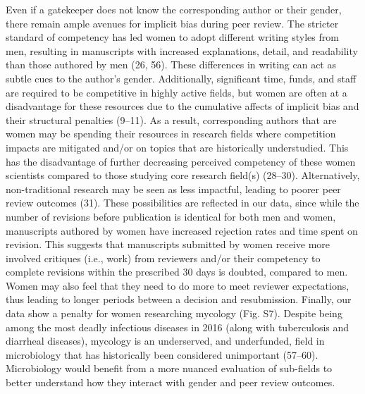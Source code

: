 \documentclass[11pt,]{article}
\begin{document}
Even if a gatekeeper does not know the corresponding author or their
gender, there remain ample avenues for implicit bias during peer review.
The stricter standard of competency has led women to adopt different
writing styles from men, resulting in manuscripts with increased
explanations, detail, and readability than those authored by men (26,
56). These differences in writing can act as subtle cues to the author's
gender. Additionally, significant time, funds, and staff are required to
be competitive in highly active fields, but women are often at a
disadvantage for these resources due to the cumulative affects of
implicit bias and their structural penalties (9--11). As a result,
corresponding authors that are women may be spending their resources in
research fields where competition impacts are mitigated and/or on topics
that are historically understudied. This has the disadvantage of further
decreasing perceived competency of these women scientists compared to
those studying core research field(s) (28--30). Alternatively,
non-traditional research may be seen as less impactful, leading to
poorer peer review outcomes (31). These possibilities are reflected in
our data, since while the number of revisions before publication is
identical for both men and women, manuscripts authored by women have
increased rejection rates and time spent on revision. This suggests that
manuscripts submitted by women receive more involved critiques (i.e.,
work) from reviewers and/or their competency to complete revisions
within the prescribed 30 days is doubted, compared to men. Women may
also feel that they need to do more to meet reviewer expectations, thus
leading to longer periods between a decision and resubmission. Finally,
our data show a penalty for women researching mycology (Fig. S7).
Despite being among the most deadly infectious diseases in 2016 (along
with tuberculosis and diarrheal diseases), mycology is an underserved,
and underfunded, field in microbiology that has historically been
considered unimportant (57--60). Microbiology would benefit from a more
nuanced evaluation of sub-fields to better understand how they interact
with gender and peer review outcomes.
\end{document}

